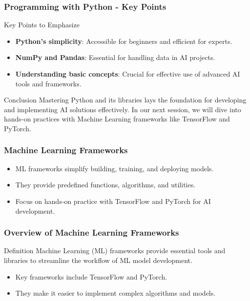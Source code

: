 \documentclass{beamer}
\begin{document}
\begin{frame}[fragile]
    \frametitle{Programming with Python - Key Points}
    \begin{block}{Key Points to Emphasize}
        \begin{itemize}
            \item \textbf{Python's simplicity}: Accessible for beginners and efficient for experts.
            \item \textbf{NumPy and Pandas}: Essential for handling data in AI projects.
            \item \textbf{Understanding basic concepts}: Crucial for effective use of advanced AI tools and frameworks.
        \end{itemize}
    \end{block}

    \begin{block}{Conclusion}
        Mastering Python and its libraries lays the foundation for developing and implementing AI solutions effectively. In our next session, we will dive into hands-on practices with Machine Learning frameworks like TensorFlow and PyTorch.
    \end{block}
\end{frame}

\begin{frame}[fragile]
    \frametitle{Machine Learning Frameworks}
    \begin{itemize}
        \item ML frameworks simplify building, training, and deploying models.
        \item They provide predefined functions, algorithms, and utilities.
        \item Focus on hands-on practice with TensorFlow and PyTorch for AI development.
    \end{itemize}
\end{frame}

\begin{frame}[fragile]
    \frametitle{Overview of Machine Learning Frameworks}
    \begin{block}{Definition}
        Machine Learning (ML) frameworks provide essential tools and libraries to streamline the workflow of ML model development.
    \end{block}
    
    \begin{itemize}
        \item Key frameworks include TensorFlow and PyTorch.
        \item They make it easier to implement complex algorithms and models.
    \end{itemize}
\end{frame}
\end{document}
